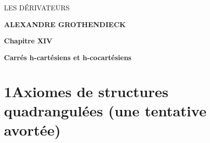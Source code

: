 \dgrchunkbegin

\printedpage{}%

\begin{center}
\vspace*{6cm}

{\LARGE \textsf{LES DÉRIVATEURS}}

\vspace{1cm}

{\large \textbf{ALEXANDRE GROTHENDIECK}}

\vspace{2cm}

{\large \textbf{Chapitre XIV}}

\vspace{0.3cm}

{\large \textbf{Carrés h-cartésiens et h-cocartésiens}}
\end{center}

\clearpage

\printedpage{}%

\vspace*{6cm}


\clearpage



\section*{1\quad Axiomes de structures quadrangulées (une tentative avortée)}

